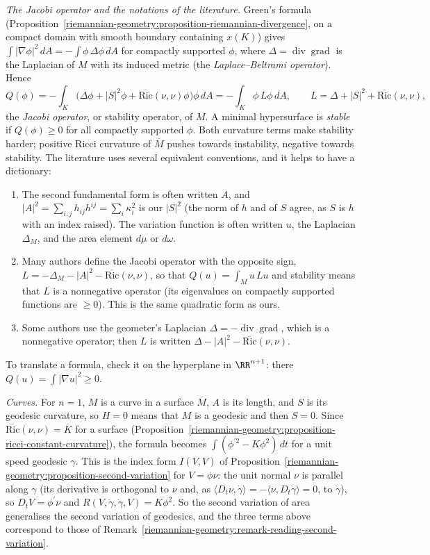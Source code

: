 \begin{remark}
\emph{The Jacobi operator and the notations of the literature.} Green's formula (Proposition~\ref{riemannian-geometry:proposition-riemannian-divergence}, on a compact domain with smooth
boundary containing $x(K)$) gives $\int|\nabla\phi|^2\,dA = -\int\phi\,\Delta\phi\,dA$ for compactly supported $\phi$, where $\Delta = \operatorname{div}\operatorname{grad}$ is the Laplacian of $M$
with its induced metric (the \emph{Laplace--Beltrami operator}). Hence
\[
Q(\phi) = -\int_K\bigl(\Delta\phi + |S|^2\phi + \overline{\mathrm{Ric}}(\nu, \nu)\phi\bigr)\phi\,dA = -\int_K\phi\,L\phi\,dA, \qquad L = \Delta + |S|^2 + \overline{\mathrm{Ric}}(\nu, \nu),
\]
the \emph{Jacobi operator}, or stability operator, of $M$. A minimal hypersurface is \emph{stable} if $Q(\phi) \geq 0$ for all compactly supported $\phi$. Both curvature terms make stability
harder; positive Ricci curvature of $\overline{M}$ pushes towards instability, negative towards stability. The literature uses several equivalent conventions, and it helps to have a
dictionary:
\begin{enumerate}
\item The second fundamental form is often written $A$, and $|A|^2 = \sum_{i,j}h_{ij}h^{ij} = \sum_i\kappa_i^2$ is our $|S|^2$ (the norm of $h$ and of $S$ agree, as $S$ is $h$ with an
index raised). The variation function is often written $u$, the Laplacian $\Delta_M$, and the area element $d\mu$ or $d\omega$.
\item Many authors define the Jacobi operator with the opposite sign, $L = -\Delta_M - |A|^2 - \overline{\mathrm{Ric}}(\nu, \nu)$, so that $Q(u) = \int_Mu\,Lu$ and stability means that $L$ is a
nonnegative operator (its eigenvalues on compactly supported functions are $\geq 0$). This is the same quadratic form as ours.
\item Some authors use the geometer's Laplacian $\Delta = -\operatorname{div}\operatorname{grad}$, which is a nonnegative operator; then $L$ is written $\Delta - |A|^2 - \overline{\mathrm{Ric}}(\nu, \nu)$.
\end{enumerate}
To translate a formula, check it on the hyperplane in $\RR^{n+1}$: there $Q(u) = \int|\nabla u|^2 \geq 0$.

\emph{Curves.} For $n = 1$, $M$ is a curve in a surface $\overline{M}$, $A$ is its length, and $S$ is its geodesic curvature, so $H = 0$ means that $M$ is a geodesic and then $S = 0$. Since
$\overline{\mathrm{Ric}}(\nu, \nu) = \overline{K}$ for a surface (Proposition~\ref{riemannian-geometry:proposition-ricci-constant-curvature}), the formula becomes $\int(\phi^{\prime 2} - K\phi^2)\,dt$ for
a unit speed geodesic $\gamma$. This is the index form $I(V, V)$ of Proposition~\ref{riemannian-geometry:proposition-second-variation} for $V = \phi\nu$: the unit normal $\nu$ is parallel along
$\gamma$ (its derivative is orthogonal to $\nu$ and, as $\langle D_t\nu, \dot\gamma\rangle = -\langle\nu, D_t\dot\gamma\rangle = 0$, to $\dot\gamma$), so $D_tV = \phi^{\prime}\nu$ and
$R(V, \dot\gamma, \dot\gamma, V) = K\phi^2$. So the second variation of area generalises the second variation of geodesics, and the three terms above correspond to those of
Remark~\ref{riemannian-geometry:remark-reading-second-variation}.
\end{remark}

